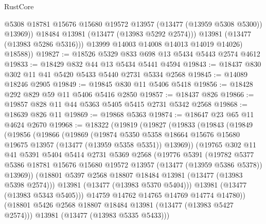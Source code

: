 \begin{lexlean}{RustCore}
\begin{coremodule}
                  @5308
                  @18781
                  @15676
                  @15680
                  @19572
                  @13957
                  (@13477 (@13959 @5308 @5300))
                  @13969))
              @18484
              @13981
              (@13477 (@13983 @5292 @2574)))
            @13981
            (@13477 (@13983 @5286 @5316)))
          @13999
          @14003
          @14008
          @14013
          @14019
          @14026)
        @18588))
@19827 := @18526 @5329 @833 @698 @13 @5434 @5443 @2574 @4612
@19833 := @18429 @832 @44 @13 @5434 @5441 @4594
@19843 := @18437 @830 @302 @11 @41 @5420 @5433 @5440 @2731 @5334 @2568
@19845 := @14089 @18246 @2905
@19849 := @19845 @830 @11 @5406 @5418
@19856 := @18428 @292 @829 @59 @11 @5406 @5416 @2850
@19857 := @18437 @826
@19866 := @19857 @828 @11 @44 @5363 @5405 @5415 @2731 @5342 @2568
@19868 := @18639 @826 @11
@19869 := @19868 @5363
@19874 := @18647 @23 @65 @11 @4624 @2670
@19968 := @18322
    (@19819
      (@19827
        (@19833
          (@19843
            (@19849
              (@19856
                (@19866
                  (@19869
                    (@19874
                      @5350
                      @5358
                      @18664
                      @15676
                      @15680
                      @19675
                      @13957
                      (@13477 (@13959 @5358 @5351))
                      @13969))
                  (@19765
                    @302
                    @11
                    @41
                    @5391
                    @5404
                    @5414
                    @2731
                    @5369
                    @2568
                    (@19776
                      @5391
                      (@19782
                        @5377
                        @5386
                        @18781
                        @15676
                        @15680
                        @19572
                        @13957
                        (@13477 (@13959 @5386 @5378))
                        @13969))
                    (@18801 @5397 @2568 @18807 @18484 @13981 (@13477 (@13983 @5398 @2574)))
                    @13981
                    (@13477 (@13983 @5370 @5404)))
                  @13981
                  (@13477 (@13983 @5343 @5405)))
                @14759
                @14762
                @14765
                @14769
                @14774
                @14780))
            (@18801 @5426 @2568 @18807 @18484 @13981 (@13477 (@13983 @5427 @2574)))
            @13981
            (@13477 (@13983 @5335 @5433)))

\end{coremodule}
\end{lexlean}
